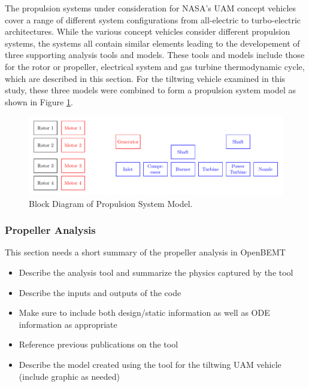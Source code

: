 
The propulsion systems under consideration for NASA's UAM concept vehicles cover a range of different system configurations from all-electric to turbo-electric architectures.
While the various concept vehicles consider different propulsion systems, the systems all contain similar elements leading to the developement of three supporting analysis tools and models.
These tools and models include those for the rotor or propeller, electrical system and gas turbine thermodynamic cycle, which are described in this section.  
For the tiltwing vehicle examined in this study, these three models were combined to form a propulsion system model as shown in Figure \ref{f:turboelectric}. 



\begin{figure}
\begin{center}
 \includegraphics[width=1.0\textwidth]{../Images/Propulsion_system.pdf}
 \caption{Block Diagram of Propulsion System Model.}
 \label{f:turboelectric}
\end{center}
\end{figure}

\subsubsection{Propeller Analysis} %
This section needs a short summary of the propeller analysis in OpenBEMT
\begin{itemize}
    \item Describe the analysis tool and summarize the physics captured by the tool
    \item Describe the inputs and outputs of the code
    \item Make sure to include both design/static information as well as ODE information as appropriate
    \item Reference previous publications on the tool
    \item Describe the model created using the tool for the tiltwing UAM vehicle (include graphic as needed)
\end{itemize}

